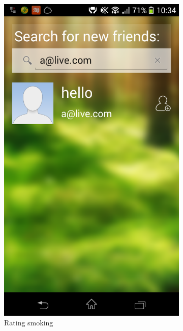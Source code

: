 \begin{figure}
\begin{subfigure}{.24\textwidth}
  \includegraphics[width=.8\linewidth]{img/screenshot/ss3.png}
  \caption{Rating smoking}
\end{subfigure}
\begin{subfigure}{.24\textwidth}
  \centering

\end{subfigure}
\end{figure}
